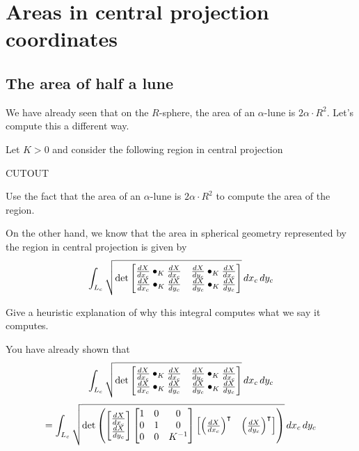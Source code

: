 \documentclass{ximera}
\begin{document}
\section{Areas in central projection coordinates}

\subsection{The area of half a lune}

We have already seen that on the $R$-sphere, the area of an
$\alpha$-lune is $2\alpha\cdot R^2$. Let's compute this a different
way.

\begin{problem}
  Let $K>0$ and consider the following region in central projection
 \begin{image}
   CUTOUT
 \end{image}
 Use the fact that the area of an $\alpha$-lune is $2\alpha\cdot R^2$
 to compute the area of the region.
\end{problem}

On the other hand, we know that the area in spherical geometry
represented by the region in central projection is given by
\[
\int_{L_c} \sqrt{
  \det
  \begin{bmatrix}
    \dd[X]{x_c}\bullet_K \dd[X]{x_c} & \dd[X]{y_c}\bullet_K \dd[X]{x_c} \\
    \dd[X]{x_c}\bullet_K \dd[X]{y_c} & \dd[X]{y_c}\bullet_K \dd[X]{y_c}
  \end{bmatrix}
}\d x_c\d y_c
\]

\begin{problem}
  Give a heuristic explanation of why this integral computes what we
  say it computes.
\end{problem}

You have already shown that
\[
\int_{L_c} \sqrt{
  \det
  \begin{bmatrix}
    \dd[X]{x_c}\bullet_K \dd[X]{x_c} & \dd[X]{y_c}\bullet_K \dd[X]{x_c} \\
    \dd[X]{x_c}\bullet_K \dd[X]{y_c} & \dd[X]{y_c}\bullet_K \dd[X]{y_c}
  \end{bmatrix}
}\d x_c\d y_c
\]
\[
=
\int_{L_c} \sqrt{
  \det\left(
  \begin{bmatrix}
    \dd[X]{x_c}\\
    \dd[X]{y_c}
  \end{bmatrix}
  \begin{bmatrix}
    1 & 0 & 0\\
    0 & 1 & 0\\
    0 & 0 & K^{-1}
  \end{bmatrix}
  \begin{bmatrix}
    \left(\dd[X]{x_c}\right)^\transpose & \left(\dd[X]{y_c}\right)^\transpose
  \end{bmatrix}\right)
}\d x_c\d y_c
\]
\end{document}
